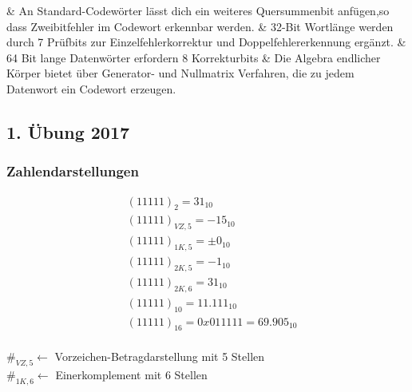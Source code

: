 \documentclass[a4paper]{scrartcl}
\begin{document}
				\begin{easylist}
					& An Standard-Codewörter lässt dich ein weiteres Quersummenbit anfügen,so dass Zweibitfehler im Codewort erkennbar werden.
					& 32-Bit Wortlänge werden durch 7 Prüfbits zur Einzelfehlerkorrektur und Doppelfehlererkennung ergänzt.
					& 64 Bit lange Datenwörter erfordern 8 Korrekturbits
					& Die Algebra endlicher Körper bietet über Generator- und Nullmatrix Verfahren, die zu jedem Datenwort ein Codewort erzeugen.
				\end{easylist}
			
			\subsection{1. Übung 2017}
			
				\subsubsection{Zahlendarstellungen}
				\begin{align*}
					&(11111)_{2} = 31_{10} \\
					&(11111)_{VZ,5} = -15_{10}\\
					&(11111)_{1K,5} = \pm 0_{10} \\
					&(11111)_{2K,5} = -1_{10} \\
					&(11111)_{2K,6} = 31_{10} \\
					&(11111)_{10} =  11.111_{10} \\
					&(11111)_{16} = 0x 01 11 11 = 69.905_{10}\\
				\end{align*}
				
				 \( \#_{VZ,5} \gets \) Vorzeichen-Betragdarstellung mit 5 Stellen\\
				 \( \#_{1K,6}\gets \) Einerkomplement mit 6 Stellen\\
				 
\end{document}

